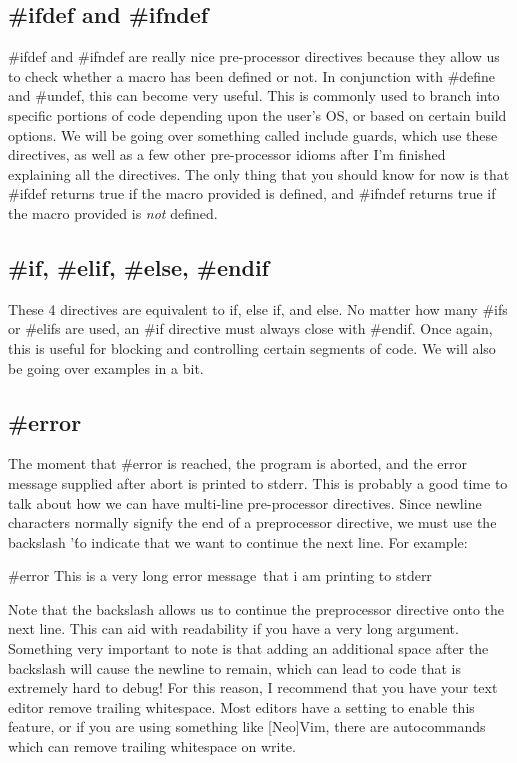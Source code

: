 \documentclass{article}
\begin{document}
\subsection{\#ifdef and \#ifndef}

\#ifdef and \#ifndef are really nice pre-processor directives because they allow us to check whether a macro has
been defined or not. In conjunction with \#define and \#undef, this can become very useful. This is commonly
used to branch into specific portions of code depending upon the user's OS, or based on certain build options.
We will be going over something called include guards, which use these directives, as well as a few other
pre-processor idioms after I'm finished explaining all the directives. The only thing that you should know for
now is that \#ifdef returns true if the macro provided is defined, and \#ifndef returns true if the macro
provided is \textit{not} defined.

\subsection{\#if, \#elif, \#else, \#endif}

These 4 directives are equivalent to if, else if, and else. No matter how many \#ifs or \#elifs are used, an
\#if directive must always close with \#endif. Once again, this is useful for blocking and controlling certain
segments of code. We will also be going over examples in a bit.

\subsection{\#error}

The moment that \#error is reached, the program is aborted, and the error message supplied after abort is
printed to stderr. This is probably a good time to talk about how we can have multi-line pre-processor
directives. Since newline characters normally signify the end of a preprocessor directive, we must use the
backslash '\' to indicate that we want to continue the next line. For example:

\begin{clst}
#error This is a very long error message\
    that i am printing to stderr
\end{clst}

Note that the backslash allows us to continue the preprocessor directive onto the next line. This can aid with
readability if you have a very long argument. Something very important to note is that adding an additional
space after the backslash will cause the newline to remain, which can lead to code that is extremely hard to
debug! For this reason, I recommend that you have your text editor remove trailing whitespace. Most editors
have a setting to enable this feature, or if you are using something like [Neo]Vim, there are autocommands
which can remove trailing whitespace on write.
\end{document}
